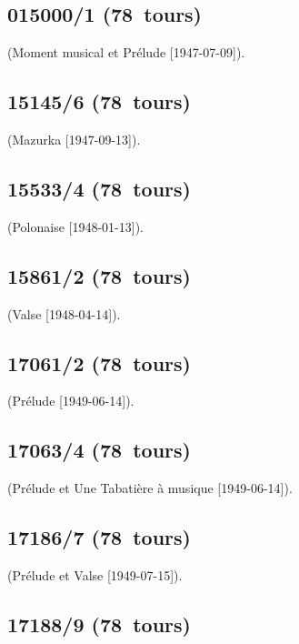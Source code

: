 \subsection{015000/1 (78~tours)}

\Rachmaninov{} (Moment musical   et Prélude 
 [1947-07-09]).

\subsection{15145/6 (78~tours)}

\Chopin{} (Mazurka   [1947-09-13]).

\subsection{15533/4 (78~tours)}

\Chopin{} (Polonaise   [1948-01-13]).

\subsection{15861/2 (78~tours)}

\Scriabine{} (Valse  [1948-04-14]).

\subsection{17061/2 (78~tours)}

\Chopin{} (Prélude   [1949-06-14]).

\subsection{17063/4 (78~tours)}

\Liadov{} (Prélude   et Une Tabatière à musique 
[1949-06-14]).

\subsection{17186/7 (78~tours)}

\Liadov{} (Prélude   et Valse  
[1949-07-15]).

\subsection{17188/9 (78~tours)}

